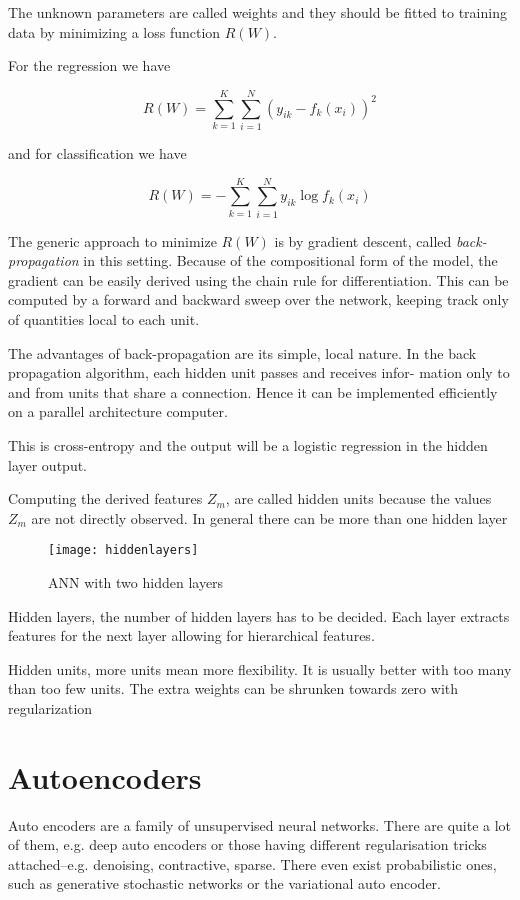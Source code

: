 The unknown parameters are called weights and they should be
fitted to training data by minimizing a loss function $R(W)$.

For the regression we have

\[
    R(W) = \sum_{k=1}^{K} \sum_{i=1}^{N} (y_{ik} - f_k(x_i))^2
\]

and for classification we have

\[
    R(W) = - \sum_{k=1}^{K} \sum_{i=1}^{N} y_{ik} \log f_k (x_i)
\]

The generic approach to minimize $R(W)$ is by gradient descent, called \textit{back-propagation} in this setting. Because of the compositional form of the model, the gradient can be easily derived using the chain rule for differentiation. This can be computed by a forward and backward sweep over the network, keeping track only of quantities local to each unit.

The advantages of back-propagation are its simple, local nature. In the
back propagation algorithm, each hidden unit passes and receives infor-
mation only to and from units that share a connection. Hence it can be
implemented efficiently on a parallel architecture computer. \cite[p.~395]{friedman2016elements}

This is cross-entropy and the output will be a logistic
regression in the hidden layer output.

Computing the derived features $Z_m$, are called hidden units because the values $Z_m$ are not directly observed. In general there can be more than one hidden layer

\begin{figure}[H]
  \centering
  \texttt{[image: hiddenlayers]}
  \caption{ANN with two hidden layers}\label{fig:hiddenlayers}
\end{figure}

Hidden layers, the number of hidden layers has to be decided. Each
layer extracts features for the next layer allowing for hierarchical
features.

Hidden units, more units mean more flexibility. It is usually better
with too many than too few units. The extra weights can be shrunken
towards zero with regularization

\section{Autoencoders}

Auto encoders are a family of unsupervised neural networks. There are quite a lot of them, e.g. deep auto encoders or those having different regularisation tricks attached--e.g. denoising, contractive, sparse. There even exist probabilistic ones, such as generative stochastic networks or the variational auto encoder. \\

